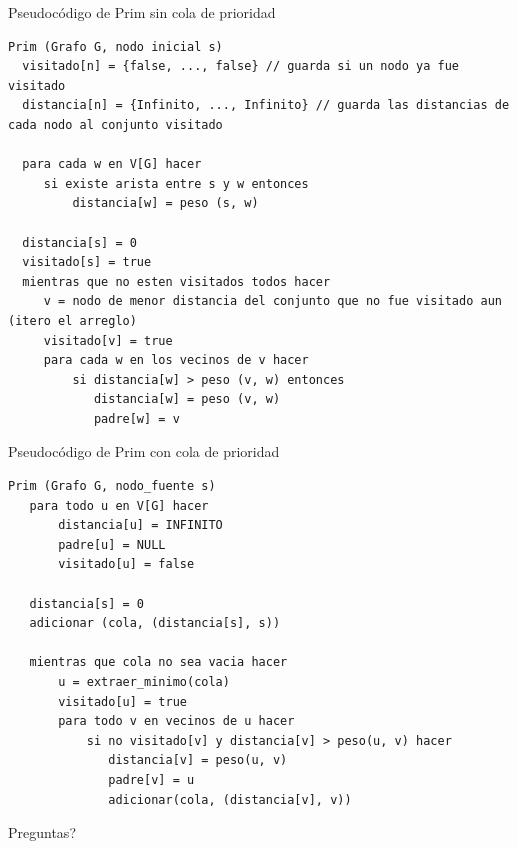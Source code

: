\documentclass[compress]{beamer}
\begin{document}
\begin{frame}[fragile]{Pseudocódigo de Prim sin cola de prioridad}
\begin{lstlisting}
Prim (Grafo G, nodo inicial s)
  visitado[n] = {false, ..., false} // guarda si un nodo ya fue visitado
  distancia[n] = {Infinito, ..., Infinito} // guarda las distancias de cada nodo al conjunto visitado
  
  para cada w en V[G] hacer
     si existe arista entre s y w entonces
         distancia[w] = peso (s, w)

  distancia[s] = 0
  visitado[s] = true
  mientras que no esten visitados todos hacer 
     v = nodo de menor distancia del conjunto que no fue visitado aun (itero el arreglo)
     visitado[v] = true
     para cada w en los vecinos de v hacer
         si distancia[w] > peso (v, w) entonces
            distancia[w] = peso (v, w)
            padre[w] = v
\end{lstlisting}
\end{frame}

\begin{frame}[fragile]{Pseudocódigo de Prim con cola de prioridad}
\begin{lstlisting}
Prim (Grafo G, nodo_fuente s)       
   para todo u en V[G] hacer
       distancia[u] = INFINITO
       padre[u] = NULL
       visitado[u] = false
       
   distancia[s] = 0
   adicionar (cola, (distancia[s], s))
   
   mientras que cola no sea vacia hacer
       u = extraer_minimo(cola)
       visitado[u] = true
       para todo v en vecinos de u hacer
           si no visitado[v] y distancia[v] > peso(u, v) hacer
              distancia[v] = peso(u, v)
              padre[v] = u
              adicionar(cola, (distancia[v], v))
\end{lstlisting}
\end{frame}


\begin{frame}
\begin{center}
{\Huge \textquestiondown Preguntas?}
\end{center}
\end{frame}
\end{document}
